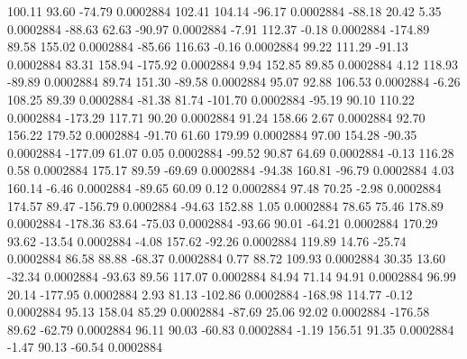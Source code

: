       100.11       93.60      -74.79     0.0002884
      102.41      104.14      -96.17     0.0002884
      -88.18       20.42        5.35     0.0002884
      -88.63       62.63      -90.97     0.0002884
       -7.91      112.37       -0.18     0.0002884
     -174.89       89.58      155.02     0.0002884
      -85.66      116.63       -0.16     0.0002884
       99.22      111.29      -91.13     0.0002884
       83.31      158.94     -175.92     0.0002884
        9.94      152.85       89.85     0.0002884
        4.12      118.93      -89.89     0.0002884
       89.74      151.30      -89.58     0.0002884
       95.07       92.88      106.53     0.0002884
       -6.26      108.25       89.39     0.0002884
      -81.38       81.74     -101.70     0.0002884
      -95.19       90.10      110.22     0.0002884
     -173.29      117.71       90.20     0.0002884
       91.24      158.66        2.67     0.0002884
       92.70      156.22      179.52     0.0002884
      -91.70       61.60      179.99     0.0002884
       97.00      154.28      -90.35     0.0002884
     -177.09       61.07        0.05     0.0002884
      -99.52       90.87       64.69     0.0002884
       -0.13      116.28        0.58     0.0002884
      175.17       89.59      -69.69     0.0002884
      -94.38      160.81      -96.79     0.0002884
        4.03      160.14       -6.46     0.0002884
      -89.65       60.09        0.12     0.0002884
       97.48       70.25       -2.98     0.0002884
      174.57       89.47     -156.79     0.0002884
      -94.63      152.88        1.05     0.0002884
       78.65       75.46      178.89     0.0002884
     -178.36       83.64      -75.03     0.0002884
      -93.66       90.01      -64.21     0.0002884
      170.29       93.62      -13.54     0.0002884
       -4.08      157.62      -92.26     0.0002884
      119.89       14.76      -25.74     0.0002884
       86.58       88.88      -68.37     0.0002884
        0.77       88.72      109.93     0.0002884
       30.35       13.60      -32.34     0.0002884
      -93.63       89.56      117.07     0.0002884
       84.94       71.14       94.91     0.0002884
       96.99       20.14     -177.95     0.0002884
        2.93       81.13     -102.86     0.0002884
     -168.98      114.77       -0.12     0.0002884
       95.13      158.04       85.29     0.0002884
      -87.69       25.06       92.02     0.0002884
     -176.58       89.62      -62.79     0.0002884
       96.11       90.03      -60.83     0.0002884
       -1.19      156.51       91.35     0.0002884
       -1.47       90.13      -60.54     0.0002884
